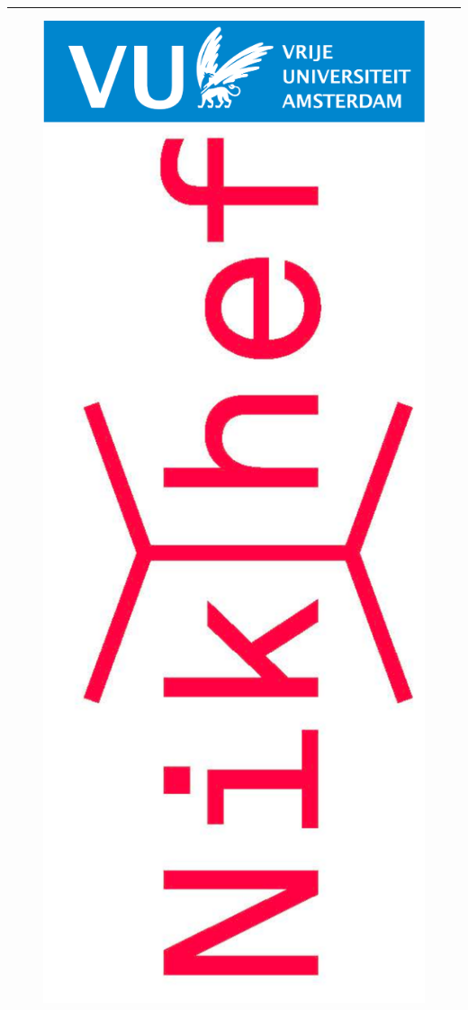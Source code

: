 \documentclass[12pt]{article}
\numberwithin{equation}{section}
\begin{document}
\begin{spacing}{1.1}
$\quad$\\
  \vskip100pt
\hrule
\vskip20pt

\begin{figure}[h]
\begin{center}
  \includegraphics[scale=0.33]{logo.pdf}\\
  \includegraphics[scale=0.23,angle=-90]{nikhef.pdf}

\end{center}
\end{figure}
\end{spacing}
\end{document}
